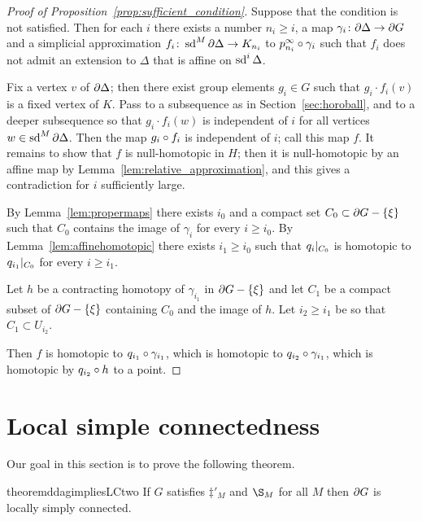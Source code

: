 \documentclass[a4paper]{article}
\begin{document}
\begin{proof}[Proof of Proposition~\ref{prop:sufficient_condition}]
  Suppose that the condition is not satisfied. Then for each $i$ there exists a
  number $n_i \geq i$, a map $\gamma_i \colon \partial\Delta \to \partial G$
  and a simplicial approximation $f_i \colon \operatorname{sd}^M \partial\Delta \to K_{n_i}$
  to $p^\infty_{n_i}\circ\gamma_i$ such that $f_i$ does not admit an
  extension to $\Delta$ that is affine on $\operatorname{sd}^i\Delta$.

  Fix a vertex $v$ of $\partial\Delta$; then there exist group elements $g_i
  \in G$ such that $g_i\cdot f_i(v)$ is a fixed vertex of $K$. Pass to a
  subsequence as in Section~\ref{sec:horoball}, and to a deeper subsequence so
  that $g_i\cdot f_i(w)$ is independent of $i$ for all vertices $w \in \operatorname{sd}^M
  \partial\Delta$. Then the map $g_i\circ f_i$ is independent of $i$; call
  this map $f$. It remains to show that $f$ is null-homotopic in $H$; then it is
  null-homotopic by an affine map by Lemma~\ref{lem:relative_approximation},
  and this gives a contradiction for $i$ sufficiently large.

  By Lemma~\ref{lem:propermaps} there exists $i_0$ and a 
  compact set $C_0 \subset \partial G - \left\{\xi\right\}$ such that $C_0$ contains the
  image of $\gamma_i$ for every $i \geq i_0$. By
  Lemma~\ref{lem:affinehomotopic} there exists $i_1 \geq i_0$ such that
  $q_i\vert_{C_0}$ is homotopic to $q_{i_1}\vert_{C_0}$ for every $i
  \geq i_1$.  
  
  Let $h$ be a contracting homotopy of $\gamma_{i_1}$ in $\partial G -
  \left\{\xi\right\}$ and let $C_1$ be a compact subset of $\partial G - \left\{\xi\right\}$
  containing $C_0$ and the image of $h$. Let $i_2 \geq i_1$ be so that $C_1
  \subset U_{i_2}$.

  Then $f$ is homotopic to $q_{i_1}\circ\gamma_{i_1}$, which is homotopic
  to $q_{i_2}\circ\gamma_{i_1}$, which is homotopic by $q_{i_2}\circ h$
  to a point.
\end{proof}

\section{Local simple connectedness}\label{sec:local_simple_connectedness}

Our goal in this section is to prove the following theorem.

\begin{restatable}{theorem}{ddagimpliesLCtwo}\label{thm:ddagimpliesLCtwo}
  If $G$ satisfies $\ddag'_M$ and $\S_M$ for all $M$ then $\partial G$ is
  locally simply connected.
\end{restatable}
\end{document}
